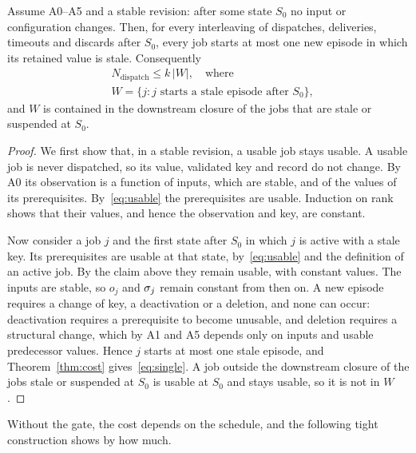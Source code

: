 \begin{theorem}\label{thm:single}
Assume A0--A5 and a stable revision: after some state $S_0$ no input or configuration changes. Then, for every interleaving of dispatches, deliveries, timeouts and discards after $S_0$, every job starts at most one new episode in which its retained value is stale. Consequently
\begin{equation}\label{eq:single}
\begin{split}
&N_{\mathrm{dispatch}}\le k\,|W|,\quad\text{where}\\
&W=\{j : j\text{ starts a stale episode after }S_0\},
\end{split}
\end{equation}
and $W$ is contained in the downstream closure of the jobs that are stale or suspended at $S_0$.
\end{theorem}
\begin{proof}
We first show that, in a stable revision, a usable job stays usable. A usable job is never dispatched, so its value, validated key and record do not change. By A0 its observation is a function of inputs, which are stable, and of the values of its prerequisites. By~\eqref{eq:usable} the prerequisites are usable. Induction on rank shows that their values, and hence the observation and key, are constant.

Now consider a job $j$ and the first state after $S_0$ in which $j$ is active with a stale key. Its prerequisites are usable at that state, by~\eqref{eq:usable} and the definition of an active job. By the claim above they remain usable, with constant values. The inputs are stable, so $o_j$ and $\sigma_j$ remain constant from then on. A new episode requires a change of key, a deactivation or a deletion, and none can occur: deactivation requires a prerequisite to become unusable, and deletion requires a structural change, which by A1 and A5 depends only on inputs and usable predecessor values. Hence $j$ starts at most one stale episode, and Theorem~\ref{thm:cost} gives~\eqref{eq:single}. A job outside the downstream closure of the jobs stale or suspended at $S_0$ is usable at $S_0$ and stays usable, so it is not in $W$.
\end{proof}

Without the gate, the cost depends on the schedule, and the following tight construction shows by how much.


